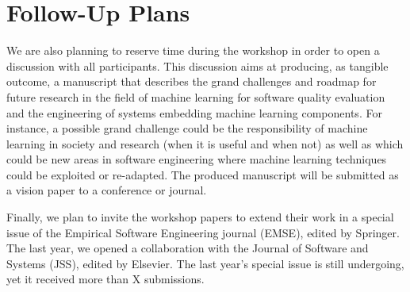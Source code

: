 
\section{Follow-Up Plans}

We are also planning to reserve time during the workshop in order to open a discussion with all participants.
This discussion aims at producing, as tangible outcome, a manuscript that describes the grand challenges and roadmap for future research in the field of machine learning for software quality evaluation and the engineering of systems embedding machine learning components.
For instance, a possible grand challenge could be the responsibility of machine learning in society and research (\eg when it is useful and when not) as well as which could be new areas in software engineering where machine learning techniques could be exploited or re-adapted.
The produced manuscript will be submitted as a vision paper to a conference or journal.

Finally, we plan to invite the workshop papers to extend their work in a special issue of the Empirical Software Engineering journal (EMSE), edited by Springer.
The last year, we opened a collaboration with the Journal of Software and Systems (JSS), edited by Elsevier.
The last year's special issue is still undergoing, yet it received more than X submissions.

